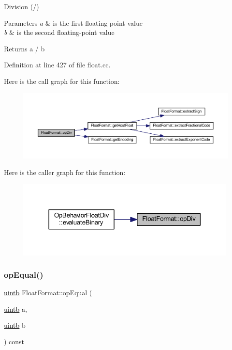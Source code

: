 Division (/) 


\begin{DoxyParams}{Parameters}
{\em a} & is the first floating-\/point value \\
\hline
{\em b} & is the second floating-\/point value \\
\hline
\end{DoxyParams}
\begin{DoxyReturn}{Returns}
a / b 
\end{DoxyReturn}


Definition at line 427 of file float.\+cc.

Here is the call graph for this function\+:
\nopagebreak
\begin{figure}[H]
\begin{center}
\leavevmode
\includegraphics[width=350pt]{class_float_format_abcd8caf82f65bac1e32be3cecd9f80e3_cgraph}
\end{center}
\end{figure}
Here is the caller graph for this function\+:
\nopagebreak
\begin{figure}[H]
\begin{center}
\leavevmode
\includegraphics[width=315pt]{class_float_format_abcd8caf82f65bac1e32be3cecd9f80e3_icgraph}
\end{center}
\end{figure}
\mbox{\label{class_float_format_a1c59c49b0bdbc8d31d2df59eb0624d06}} 
\subsubsection{\texorpdfstring{opEqual()}{opEqual()}}
{\footnotesize\ttfamily \mbox{\hyperlink{types_8h_a2db313c5d32a12b01d26ac9b3bca178f}{uintb}} Float\+Format\+::op\+Equal (\begin{DoxyParamCaption}\item[{\mbox{\hyperlink{types_8h_a2db313c5d32a12b01d26ac9b3bca178f}{uintb}}}]{a,  }\item[{\mbox{\hyperlink{types_8h_a2db313c5d32a12b01d26ac9b3bca178f}{uintb}}}]{b }\end{DoxyParamCaption}) const}



